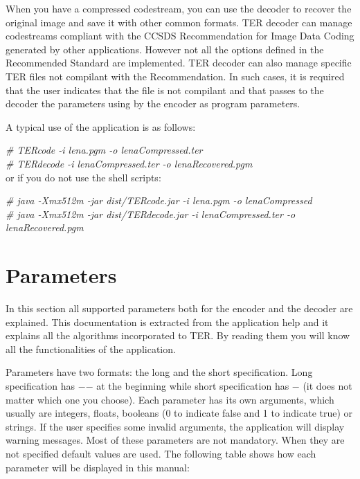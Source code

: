 \documentclass[a4paper,10pt]{article}
\begin{document}
When you have a compressed codestream, you can use the decoder to
recover the original image and save it with other common
formats. TER decoder can manage codestreams compliant with the CCSDS
Recommendation for Image Data Coding generated by other
applications. However not all the options 
defined in the Recommended Standard are implemented. TER decoder can
also manage specific TER files not compilant with the Recommendation.
In such cases, it is required that the user indicates that the file is
not compilant and that passes to the decoder the parameters using by
the encoder as program parameters.

A typical use of the application is as follows: 

\hspace{0.5cm}\emph{\# TERcode -i lena.pgm -o lenaCompressed.ter} \\ 
\hspace{0.5cm}\emph{\# TERdecode -i lenaCompressed.ter -o
  lenaRecovered.pgm} \\  

or if you do not use the shell scripts:

\hspace{0.5cm}\emph{\# java -Xmx512m -jar dist/TERcode.jar -i
  lena.pgm -o lenaCompressed} \\ 
\hspace{0.5cm}\emph{\# java -Xmx512m -jar dist/TERdecode.jar -i
  lenaCompressed.ter -o lenaRecovered.pgm} \\  

\newpage
\section{Parameters}
\label{sect:parameters}

In this section all supported parameters both for the encoder and
the decoder are explained. This documentation is extracted from the
application help and it explains all the algorithms incorporated to
TER. By reading them you will know all the functionalities of the
application. 

Parameters have two formats: the long and the short
specification. Long specification has $-$$-$ at the beginning while
short specification has $-$ (it does not matter which one you
choose). Each parameter has its own arguments, which usually are
integers, floats, booleans (0 to indicate false and 1 to indicate
true) or strings. If the user specifies some invalid arguments, the
application will display warning messages. Most of these parameters
are not mandatory. When they are not specified default values are
used. The following table shows how each parameter will be
displayed in this manual: 
\end{document}

